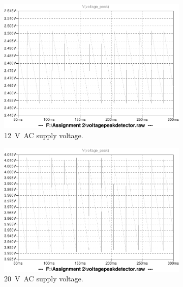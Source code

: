 \begin{figure}
 \centering
     \begin{subfigure}[]{0.45\textwidth}
        \centering
         \includegraphics[width=1\linewidth]{./Figures/voltagetransducer12vsim.pdf}
		    \caption{\SI{12}{\volt AC} supply voltage.} \label{subfig:AC}
     \end{subfigure}
      \begin{subfigure}[]{0.45\textwidth}
              \centering
  		\includegraphics[width=1\linewidth]{./Figures/voltagetransducer20vsim.pdf}
		    \caption{\SI{20}{\volt AC} supply voltage.}
     \end{subfigure}
     \begin{subfigure}[]{0.45\textwidth} 
             \centering

\end{subfigure}
\end{figure}

